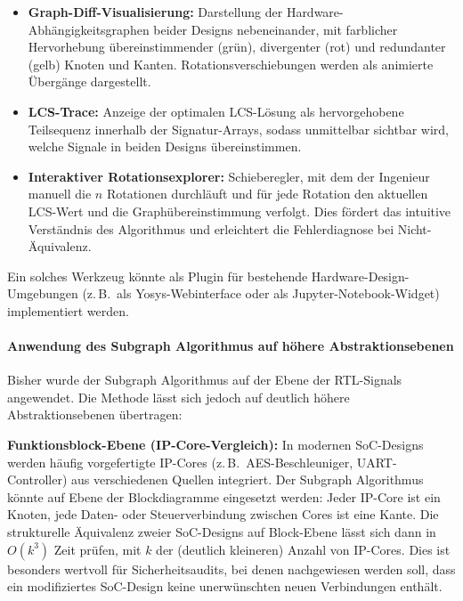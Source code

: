 ﻿\documentclass[12pt,a4paper]{report}
\begin{document}
\begin{itemize}
    \item \textbf{Graph-Diff-Visualisierung:} Darstellung der Hardware-Abhängigkeitsgraphen
          beider Designs nebeneinander, mit farblicher Hervorhebung übereinstimmender
          (grün), divergenter (rot) und redundanter (gelb) Knoten und Kanten.
          Rotationsverschiebungen werden als animierte Übergänge dargestellt.
    \item \textbf{LCS-Trace:} Anzeige der optimalen LCS-Lösung als hervorgehobene
          Teilsequenz innerhalb der Signatur-Arrays, sodass unmittelbar sichtbar wird,
          welche Signale in beiden Designs übereinstimmen.
    \item \textbf{Interaktiver Rotationsexplorer:} Schieberegler, mit dem der Ingenieur
          manuell die $n$ Rotationen durchläuft und für jede Rotation den aktuellen
          LCS-Wert und die Graphübereinstimmung verfolgt. Dies fördert das intuitive
          Verständnis des Algorithmus und erleichtert die Fehlerdiagnose bei
          Nicht-Äquivalenz.
\end{itemize}

Ein solches Werkzeug könnte als Plugin für bestehende Hardware-Design-Umgebungen
(z.\,B.\ als Yosys-Webinterface oder als Jupyter-Notebook-Widget) implementiert werden.

\paragraph{Anwendung des Subgraph Algorithmus auf höhere Abstraktionsebenen}

Bisher wurde der Subgraph Algorithmus auf der Ebene der RTL-Signals angewendet.
Die Methode lässt sich jedoch auf deutlich höhere Abstraktionsebenen übertragen:

\textbf{Funktionsblock-Ebene (IP-Core-Vergleich):} In modernen SoC-Designs werden
häufig vorgefertigte IP-Cores (z.\,B.\ AES-Beschleuniger, UART-Controller) aus
verschiedenen Quellen integriert. Der Subgraph Algorithmus könnte auf Ebene der
Blockdiagramme eingesetzt werden: Jeder IP-Core ist ein Knoten, jede Daten- oder
Steuerverbindung zwischen Cores ist eine Kante. Die strukturelle Äquivalenz zweier
SoC-Designs auf Block-Ebene lässt sich dann in $O(k^3)$ Zeit prüfen, mit $k$ der
(deutlich kleineren) Anzahl von IP-Cores. Dies ist besonders wertvoll für
Sicherheitsaudits, bei denen nachgewiesen werden soll, dass ein modifiziertes SoC-Design
keine unerwünschten neuen Verbindungen enthält.
\end{document}
